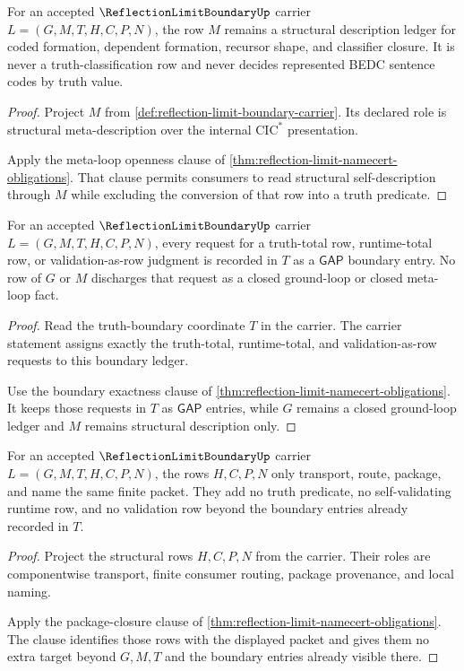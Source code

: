 \begin{theorem}
\label{thm:reflection-limit-meta-loop-openness-obligation}
For an accepted $\ReflectionLimitBoundaryUp$ carrier $L=(G,M,T,H,C,P,N)$, the row $M$ remains a structural description ledger for coded formation, dependent formation, recursor shape, and classifier closure. It is never a truth-classification row and never decides represented BEDC sentence codes by truth value.
\end{theorem}
\begin{proof}
Project $M$ from \autoref{def:reflection-limit-boundary-carrier}. Its declared role is structural meta-description over the internal $\mathrm{CIC}^{*}$ presentation.

Apply the meta-loop openness clause of \autoref{thm:reflection-limit-namecert-obligations}. That clause permits consumers to read structural self-description through $M$ while excluding the conversion of that row into a truth predicate.
\end{proof}

\begin{theorem}
\label{thm:reflection-limit-boundary-exactness-obligation}
For an accepted $\ReflectionLimitBoundaryUp$ carrier $L=(G,M,T,H,C,P,N)$, every request for a truth-total row, runtime-total row, or validation-as-row judgment is recorded in $T$ as a $\mathsf{GAP}$ boundary entry. No row of $G$ or $M$ discharges that request as a closed ground-loop or closed meta-loop fact.
\end{theorem}
\begin{proof}
Read the truth-boundary coordinate $T$ in the carrier. The carrier statement assigns exactly the truth-total, runtime-total, and validation-as-row requests to this boundary ledger.

Use the boundary exactness clause of \autoref{thm:reflection-limit-namecert-obligations}. It keeps those requests in $T$ as $\mathsf{GAP}$ entries, while $G$ remains a closed ground-loop ledger and $M$ remains structural description only.
\end{proof}

\begin{theorem}
\label{thm:reflection-limit-package-closure-obligation}
For an accepted $\ReflectionLimitBoundaryUp$ carrier $L=(G,M,T,H,C,P,N)$, the rows $H,C,P,N$ only transport, route, package, and name the same finite packet. They add no truth predicate, no self-validating runtime row, and no validation row beyond the boundary entries already recorded in $T$.
\end{theorem}
\begin{proof}
Project the structural rows $H,C,P,N$ from the carrier. Their roles are componentwise transport, finite consumer routing, package provenance, and local naming.

Apply the package-closure clause of \autoref{thm:reflection-limit-namecert-obligations}. The clause identifies those rows with the displayed packet and gives them no extra target beyond $G,M,T$ and the boundary entries already visible there.
\end{proof}

